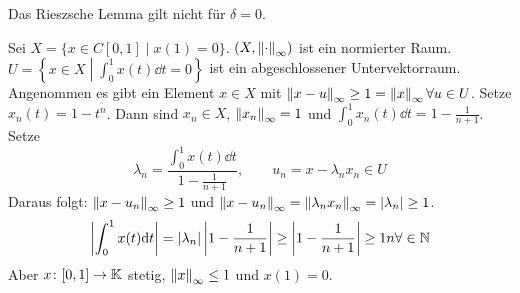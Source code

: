 \begin{bemerkung*}
Das Rieszsche Lemma gilt nicht f\"ur $ \delta=0 $.
\begin{beispiel*}
Sei $ X=\lbrace x\in C[0,1]\mid x(1)=0\rbrace $. $ (X,\left\|\cdot\right\|_\infty) $ ist ein normierter Raum. $ U=\left\lbrace x\in X\middle| \int_0^1x(t)\dd t=0\right\rbrace $ ist ein abgeschlossener Untervektorraum.\\
Angenommen es gibt ein Element $ x\in X $ mit $ \left\|x-u\right\|_\infty\geq 1=\left\|x\right\|_\infty\forall u\in U $. Setze $ x_n(t)=1-t^n $. Dann sind $ x_n\in X $, $ \left\|x_n\right\|_\infty=1 $ und $ \int_0^1x_n(t)\dd t=1-\frac{1}{n+1} $. Setze
\[ \lambda_n=\frac{\int_0^1 x(t)\dd t}{1-\frac{1}{n+1}},\qquad u_n=x-\lambda_nx_n\in U \]
Daraus folgt: $ \left\|x-u_n\right\|_\infty\geq 1 $ und $ \left\|x-u_n\right\|_\infty=\left\|\lambda_nx_n\right\|_\infty=|\lambda_n|\geq 1 $.
\[ \left|\int_0^1 x(t)\mathrm d t\right|=|\lambda_n|\left|1-\frac{1}{n+1}\right|\geq\left|1-\frac{1}{n+1}\right|\geq 1 n\forall\in\mathbb{N} \]
Aber $ x\colon[0,1]\rightarrow\mathbb{K} $ stetig, $ \left\|x\right\|_\infty\leq 1 $ und $ x(1)=0 $.
\end{beispiel*}
\end{bemerkung*}